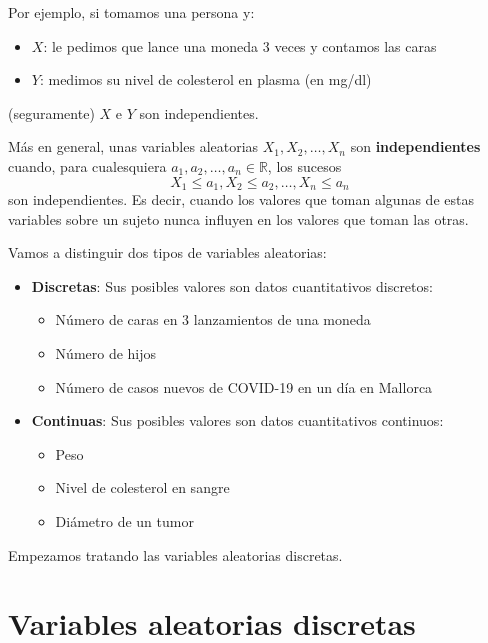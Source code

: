 \documentclass[
  spanish,
  letterpaper,
  DIV=11,
  numbers=noendperiod]{scrreprt}
\providecommand{\tightlist}{%
  \setlength{\itemsep}{0pt}\setlength{\parskip}{0pt}}
\begin{document}
\begin{tcolorbox}
Por ejemplo, si tomamos una persona y:

\begin{itemize}
\item
  \(X\): le pedimos que lance una moneda 3 veces y contamos las caras
\item
  \(Y\): medimos su nivel de colesterol en plasma (en mg/dl)
\end{itemize}

(seguramente) \(X\) e \(Y\) son independientes.

Más en general, unas variables aleatorias \(X_1,X_2,\ldots,X_n\) son
\textbf{independientes} cuando, para cualesquiera
\(a_1,a_2,\ldots,a_n\in \mathbb{R}\), los sucesos \[
X_1\leqslant a_1, X_2\leqslant a_2,\ldots, X_n\leqslant a_n
\] son independientes. Es decir, cuando los valores que toman algunas de
estas variables sobre un sujeto nunca influyen en los valores que toman
las otras.

Vamos a distinguir dos tipos de variables aleatorias:

\begin{itemize}
\item
  \textbf{Discretas}: Sus posibles valores son datos cuantitativos
  discretos:

  \begin{itemize}
  \tightlist
  \item
    Número de caras en 3 lanzamientos de una moneda
  \item
    Número de hijos
  \item
    Número de casos nuevos de COVID-19 en un día en Mallorca
  \end{itemize}
\item
  \textbf{Continuas}: Sus posibles valores son datos cuantitativos
  continuos:

  \begin{itemize}
  \tightlist
  \item
    Peso
  \item
    Nivel de colesterol en sangre
  \item
    Diámetro de un tumor
  \end{itemize}
\end{itemize}

Empezamos tratando las variables aleatorias discretas.

\section{Variables aleatorias
discretas}\label{variables-aleatorias-discretas}


\end{tcolorbox}
\end{document}
